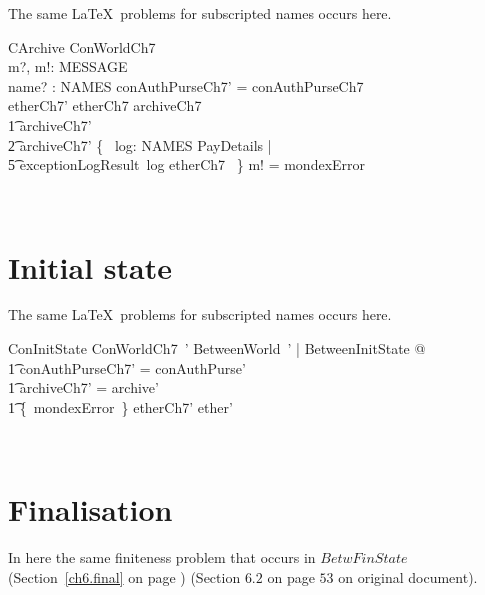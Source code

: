 The same \LaTeX\ problems for subscripted names occurs here.
%
\begin{LSDef}
\begin{schema}{CArchive}
  \Delta ConWorldCh7
  \\      m?, m!: MESSAGE
  \\      name? : NAMES
  \where
  conAuthPurseCh7' = conAuthPurseCh7
  \\      etherCh7' \subseteq etherCh7
  \also
  archiveCh7 \subseteq
  \\ \t1          archiveCh7' \subseteq
  \\ \t2          archiveCh7' \cup \{~ log: NAMES \cross PayDetails |
  \\ \t5                          exceptionLogResult~log \in etherCh7 ~\}
  \also
  m! = mondexError
\end{schema}~\end{LSDef}

\section{Initial state}

The same \LaTeX\ problems for subscripted names occurs here.
%
\begin{LSDef}
\begin{schema}{ConInitState}
  ConWorldCh7~'
  \where
  \exists BetweenWorld~' | BetweenInitState @
  \\ \t1          conAuthPurseCh7' = conAuthPurse'
  \\ \t1          \land archiveCh7' = archive'
  \\ \t1          \land \{~mondexError~\} \subseteq etherCh7' \subseteq ether'
\end{schema}~\end{LSDef}

\section{Finalisation}

In here the same finiteness problem that occurs in $BetwFinState$
(Section~\ref{ch6.final} on page \pageref{ch6.final}) (Section $6.2$ on page
$53$ on original document).

